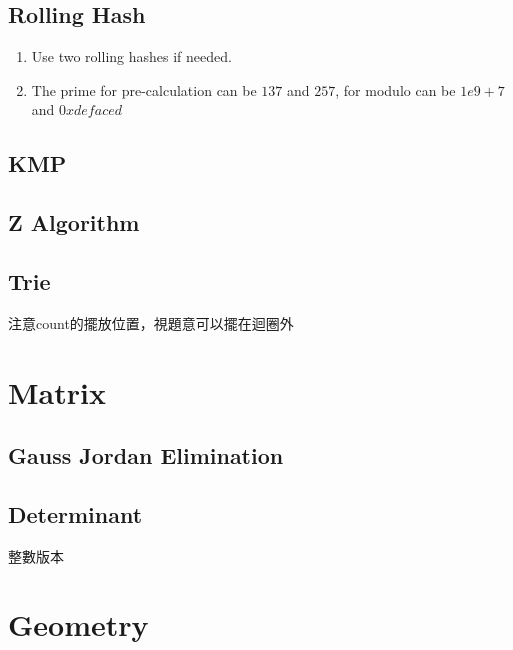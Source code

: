 \documentclass[10pt,oneside]{article}
\begin{document}
\begin{landscape}
\begin{multicols}{2}
\subsection{Rolling Hash}

{\normalsize 
\begin{enumerate}
	\item Use two rolling hashes if needed.  
	\item The prime for pre-calculation can be $137$ and $257$, for modulo can be $1e9 + 7$ and $0xdefaced$ 
\end{enumerate}
}


\subsection{KMP}


\subsection{Z Algorithm}


\subsection{Trie}
{\normalsize 
注意count的擺放位置，視題意可以擺在迴圈外
}

\section{Matrix}

\subsection{Gauss Jordan Elimination}

\subsection{Determinant}

{\normalsize 
整數版本
}



\section{Geometry}


\end{multicols}
\end{landscape}
\end{document}

